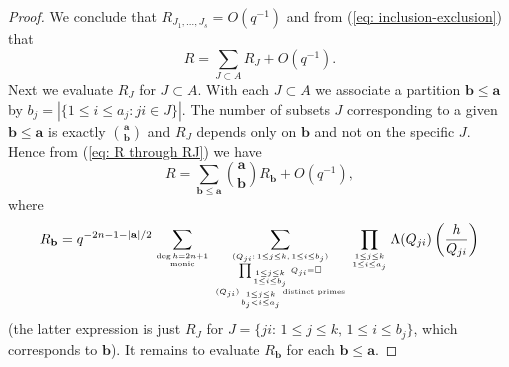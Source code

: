 \documentclass[alphabetic, 
        colorlinks,
        linkcolor=red,  citecolor=blue,
        backref
]{amsart}
\numberwithin{equation}{section}
\theoremstyle{definition}
\begin{document}
\begin{proof}
We conclude that $R_{J_1,\ldots,J_s}=O(q^{-1})$ and from (\ref{eq: inclusion-exclusion}) that
\begin{equation}\label{eq: R through RJ}R=\sum_{J\subset A}R_J+O(q^{-1}).\end{equation}
Next we evaluate $R_J$ for $J\subset A$.
With each $J\subset A$ we associate a partition $\mathbf b\le\mathbf a$ by $b_j=|\{1\le i\le a_j: ji\in J\}|$.
The number of subsets $J$ corresponding to a given $\mathbf b\le\mathbf a$ is exactly $\mathbf a\choose\mathbf b$ and $R_J$ depends only on $\mathbf b$ and not on the specific $J$. Hence from (\ref{eq: R through RJ}) we have
\begin{equation}\label{eq: R through Rb}R=\sum_{\mathbf b\le\mathbf a}{\mathbf a\choose\mathbf b}R_{\mathbf b}+O(q^{-1}),\end{equation}
where
$$R_{\mathbf b}=q^{-2n-1-|\mathbf a|/2}
\sum_{\deg h=2n+1\atop{\mathrm{monic}}}
\sum_
{(Q_{ji}:\,1\le j\le k,\,1\le i\le b_j)\atop{\prod_{1\le j\le k\atop{1\le i\le b_j}}Q_{ji}=\square\atop{(Q_{ji})_{1\le j\le k\atop{b_j<i\le a_j}}\text{distinct primes}}}}
\prod_{1\le j\le k\atop{1\le i\le a_j}}\Lambda(Q_{ji})\left(\frac{h}{Q_{ji}}\right)
$$
(the latter expression is just $R_J$ for $J=\{ji:\,1\le j\le k,\,1\le i\le b_j\}$, which corresponds to $\mathbf b$).
It remains to evaluate $R_{\mathbf b}$ for each $\mathbf b\le\mathbf a$.


\end{proof}
\end{document}
